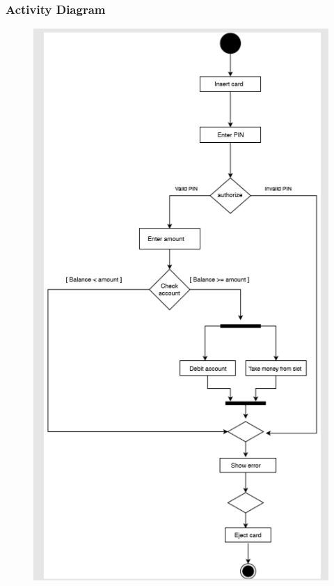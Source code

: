 \documentclass{article}
\begin{document}
		\newpage\subsubsection{Activity Diagram}
		\begin{figure}[h!]
			\begin{center}
				\includegraphics[height=\linewidth]{img/withdraw_activity.png}
			\end{center}
		\end{figure}
\end{document}
